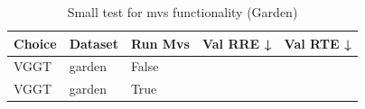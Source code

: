 \begin{table}[H]
\caption{\ifdefined\customcaption \customcaption \else Small test for mvs functionality (Garden) \fi}
\label{tab:99_mvs_garden}
\centering
\scriptsize
\begin{tabular}{lllrr}
\toprule
Choice & Dataset & Run Mvs & Val RRE ↓ & Val RTE ↓ \\
\midrule
VGGT & garden & False &  &  \\
VGGT & garden & True &  &  \\
\bottomrule
\end{tabular}
\end{table}